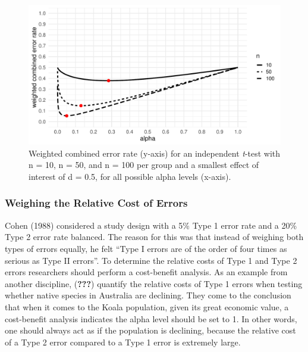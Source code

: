 \documentclass[
  english,
  ,jou,floatsintext]{apa6}
\begin{document}
\begin{figure}
\centering
\includegraphics{Justify_in_Practice_files/figure-latex/weight-plot-1.pdf}
\caption{\label{fig:weight-plot}Weighted combined error rate (y-axis) for an independent \emph{t}-test with n = 10, n = 50, and n = 100 per group and a smallest effect of interest of d = 0.5, for all possible alpha levels (x-axis).}
\end{figure}

\hypertarget{weighing-the-relative-cost-of-errors}{%
\subsubsection{Weighing the Relative Cost of Errors}\label{weighing-the-relative-cost-of-errors}}

Cohen (1988) considered a study design with a 5\% Type 1 error rate and a 20\% Type 2 error rate balanced. The reason for this was that instead of weighing both types of errors equally, he felt ``Type I errors are of the order of four times as serious as Type II errors''. To determine the relative costs of Type 1 and Type 2 errors researchers should perform a cost-benefit analysis. As an example from another discipline, ({\textbf{???}}) quantify the relative costs of Type 1 errors when testing whether native species in Australia are declining. They come to the conclusion that when it comes to the Koala population, given its great economic value, a cost-benefit analysis indicates the alpha level should be set to 1. In other words, one should always act as if the population is declining, because the relative cost of a Type 2 error compared to a Type 1 error is extremely large.
\end{document}
